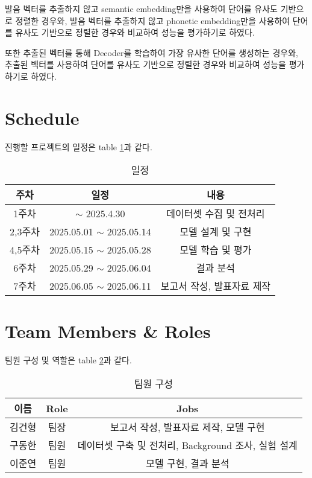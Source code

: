 \documentclass[11pt]{article}
\begin{document}
발음 벡터를 추출하지 않고 semantic embedding만을 사용하여 단어를 유사도 기반으로 정렬한 경우와, 발음 벡터를 추출하지 않고 phonetic embedding만을 사용하여 단어를 유사도 기반으로 정렬한 경우와 비교하여 성능을 평가하기로 하였다.

또한 추출된 벡터를 통해 Decoder를 학습하여 가장 유사한 단어를 생성하는 경우와, 추출된 벡터를 사용하여 단어를 유사도 기반으로 정렬한 경우와 비교하여 성능을 평가하기로 하였다.

\section{Schedule}
진행할 프로젝트의 일정은 table \ref{tab:schedule}과 같다.
\begin{table}[h]
    \centering
    \begin{tabular}{|c|c|c|}
        \hline
        \textbf{주차} & \textbf{일정}                  & \textbf{내용}     \\ \hline
        1주차       & $\sim$ 2025.4.30             & 데이터셋 수집 및 전처리   \\ \hline
        2,3주차       & 2025.05.01 $\sim$ 2025.05.14 & 모델 설계 및 구현      \\ \hline
        4,5주차       & 2025.05.15 $\sim$ 2025.05.28 & 모델 학습 및 평가      \\ \hline
        6주차         & 2025.05.29 $\sim$ 2025.06.04 & 결과 분석           \\ \hline
        7주차         & 2025.06.05 $\sim$ 2025.06.11 & 보고서 작성, 발표자료 제작 \\ \hline
    \end{tabular}
    \caption{일정}
    \label{tab:schedule}
\end{table}

\section{Team Members \& Roles}
팀원 구성 및 역할은 table \ref{tab:team}과 같다.
\begin{table}[h]
    \centering
    \begin{tabular}{|c|c|c|}
        \hline
        \textbf{이름} & \textbf{Role} & \textbf{Jobs}                       \\ \hline
        김건형         & 팀장            & 보고서 작성, 발표자료 제작, 모델 구현              \\ \hline
        구동한         & 팀원            & 데이터셋 구축 및 전처리, Background 조사, 실험 설계 \\ \hline
        이준연         & 팀원            & 모델 구현, 결과 분석                        \\ \hline
    \end{tabular}
    \caption{팀원 구성}
    \label{tab:team}
\end{table}




\end{document}
